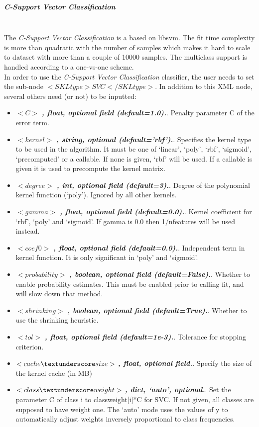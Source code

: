 \subparagraph{C-Support Vector Classification}
\mbox{}
\\The \textit{C-Support Vector Classification} is a based on libsvm. The fit time complexity is more than quadratic with the number of samples which makes it hard to scale to dataset with more than a couple of 10000 samples.
The multiclass support is handled according to a one-vs-one scheme.
\\In order to use the \textit{C-Support Vector Classification} classifier, the user needs to set the sub-node $<SKLtype>SVC</SKLtype>$.
In addition to this XML node, several others need (or not) to be inputted:
\begin{itemize}
  \item $<C>$ \textbf{\textit{, float, optional field (default=1.0).}}. Penalty parameter C of the error term.
  \item $<kernel>$ \textbf{\textit{, string, optional (default=’rbf’).}}. Specifies the kernel type to be used in the algorithm. It must be one of ‘linear’, ‘poly’, ‘rbf’, ‘sigmoid’, ‘precomputed’ or a callable. If none is given, ‘rbf’ will be used. If a callable is given it is used to precompute the kernel matrix.
  \item $<degree>$ \textbf{\textit{, int, optional field (default=3).}}. Degree of the polynomial kernel function (‘poly’). Ignored by all other kernels.
  \item $<gamma>$ \textbf{\textit{, float, optional field (default=0.0).}}. Kernel coefficient for ‘rbf’, ‘poly’ and ‘sigmoid’. If gamma is 0.0 then 1/n\textunderscore features will be used instead.
  \item $<coef0>$ \textbf{\textit{, float, optional field (default=0.0).}}. Independent term in kernel function. It is only significant in ‘poly’ and ‘sigmoid’.
  \item $<probability>$ \textbf{\textit{, boolean, optional field (default=False).}}. Whether to enable probability estimates. This must be enabled prior to calling fit, and will slow down that method.
  \item $<shrinking>$ \textbf{\textit{, boolean, optional field (default=True).}}. Whether to use the shrinking heuristic.
  \item $<tol>$ \textbf{\textit{, float, optional field (default=1e-3).}}. Tolerance for stopping criterion.
  \item $<cache\textunderscore size>$ \textbf{\textit{, float, optional field.}}. Specify the size of the kernel cache (in MB)
  \item $<class\textunderscore weight>$ \textbf{\textit{, {dict, ‘auto’}, optional.}}. Set the parameter C of class i to class\textunderscore weight[i]*C for SVC. If not given, all classes are supposed to have weight one. The ‘auto’ mode uses the values of y to automatically adjust weights inversely proportional to class frequencies.

\end{itemize}
